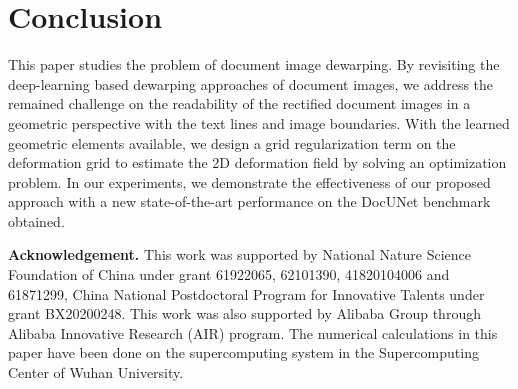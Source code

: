 \documentclass[10pt,twocolumn,letterpaper]{article}
\newcommand{\myparagraph}[1]{\vspace{1pt} \noindent \textbf{#1} }
\begin{document}
\section{Conclusion}
\label{sec:concl}
This paper studies the problem of document image dewarping. By revisiting the deep-learning based dewarping approaches of document images, we address the remained challenge on the readability of the rectified document images in a geometric perspective with the text lines and image boundaries. With the learned geometric elements available, we design a grid regularization term on the deformation grid to estimate the 2D deformation field by solving an optimization problem. In our experiments, we demonstrate the effectiveness of our proposed approach with a new state-of-the-art performance on the DocUNet benchmark obtained.

\myparagraph{Acknowledgement.}
This work was supported by National Nature Science Foundation of China under grant 61922065, 62101390, 41820104006 and 61871299, China National Postdoctoral Program for Innovative Talents under grant BX20200248. This work was also supported by Alibaba Group through Alibaba Innovative Research (AIR) program.
The numerical calculations in this paper have been done on the supercomputing system in the Supercomputing Center of Wuhan University.







 











{\small


}
\end{document}
